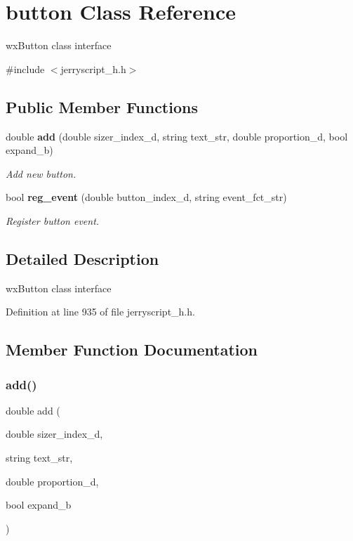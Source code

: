 \section{button Class Reference}
\label{classbutton}


wx\+Button class interface  




{\ttfamily \#include $<$jerryscript\+\_\+h.\+h$>$}

\subsection*{Public Member Functions}
\begin{DoxyCompactItemize}
\item 
double \textbf{ add} (double sizer\+\_\+index\+\_\+d, string text\+\_\+str, double proportion\+\_\+d, bool expand\+\_\+b)
\begin{DoxyCompactList}\small\item\em Add new button. \end{DoxyCompactList}\item 
bool \textbf{ reg\+\_\+event} (double button\+\_\+index\+\_\+d, string event\+\_\+fct\+\_\+str)
\begin{DoxyCompactList}\small\item\em Register button event. \end{DoxyCompactList}\end{DoxyCompactItemize}


\subsection{Detailed Description}
wx\+Button class interface 

Definition at line 935 of file jerryscript\+\_\+h.\+h.



\subsection{Member Function Documentation}
\mbox{\label{classbutton_aa718efb3db1aa6e994d4ee0f4b31e024}} 
\subsubsection{add()}
{\footnotesize\ttfamily double add (\begin{DoxyParamCaption}\item[{double}]{sizer\+\_\+index\+\_\+d,  }\item[{string}]{text\+\_\+str,  }\item[{double}]{proportion\+\_\+d,  }\item[{bool}]{expand\+\_\+b }\end{DoxyParamCaption})}



